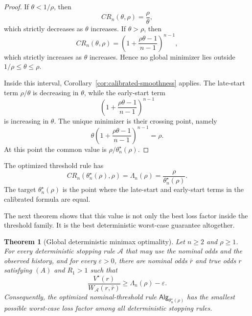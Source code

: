 \documentclass[11pt,a4paper]{article}
\newtheorem{theorem}{Theorem}
\newcommand{\alg}{\mathsf{Alg}}
\begin{document}
\begin{proof}
If \(\theta<1/\rho\), then
\[
  CR_n(\theta,\rho)=\frac{\rho}{\theta},
\]
which strictly decreases as \(\theta\) increases.  If \(\theta>\rho\), then
\[
  CR_n(\theta,\rho)
  =
  \left(1+\frac{\rho\theta-1}{n-1}\right)^{n-1},
\]
which strictly increases as \(\theta\) increases.  Hence no global minimizer
lies outside \(1/\rho\le\theta\le\rho\).

Inside this interval, Corollary~\ref{cor:calibrated-smoothness} applies.  The
late-start term \(\rho/\theta\) is decreasing in \(\theta\), while the
early-start term
\[
  \left(1+\frac{\rho\theta-1}{n-1}\right)^{n-1}
\]
is increasing in \(\theta\).  The unique minimizer is their crossing point,
namely
\[
  \theta
  \left(1+\frac{\rho\theta-1}{n-1}\right)^{n-1}
  =
  \rho.
\]
At this point the common value is \(\rho/\theta_n^\star(\rho)\).
\end{proof}

The optimized threshold rule has
\[
  CR_n(\theta_n^\star(\rho),\rho)
  =
  \Lambda_n(\rho)
  =
  \frac{\rho}{\theta_n^\star(\rho)}.
\]
The target \(\theta_n^\star(\rho)\) is the point where the late-start and
early-start terms in the calibrated formula are equal.

The next theorem shows that this value is not only the best loss factor inside
the threshold family.  It is the best deterministic worst-case guarantee
altogether.

\begin{theorem}[Global deterministic minimax optimality]
\label{thm:deterministic-minimax}
Let \(n\ge2\) and \(\rho\ge1\).  For every deterministic stopping rule
\(\mathcal A\) that may use the nominal odds and the observed history, and for
every \(\varepsilon>0\), there are nominal odds \(\bar r\) and true odds \(r\)
satisfying \((A)\) and \(R_1>1\) such that
\[
  \frac{V^\star(r)}{W_{\mathcal A}(r,\bar r)}
  \ge
  \Lambda_n(\rho)-\varepsilon.
\]
Consequently, the optimized nominal-threshold rule
\(\alg_{\theta_n^\star(\rho)}\) has the smallest possible worst-case loss factor
among all deterministic stopping rules.
\end{theorem}
\end{document}
